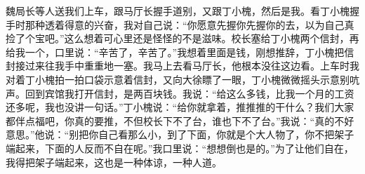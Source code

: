 \documentclass[12pt,oneside]{book}
\begin{document}
魏局长等人送我们上车，跟马厅长握手道别，又跟丁小槐，然后是我。看丁小槐握手时那种透着得意的兴奋，我对自己说：``你愿意先握你先握你的去，以为自己真捡了个宝吧。''这么想着可心里还是怪怪的不是滋味。校长塞给丁小槐两个信封，再给我一个，口里说：``辛苦了，辛苦了。''我想着里面是钱，刚想推辞，丁小槐把信封接过来往我手中重重地一塞。我马上去看马厅长，他根本没往这边看。上车时我对着丁小槐拍一拍口袋示意着信封，又向大徐瞟了一眼，丁小槐微微摇头示意别吭声。回到宾馆我打开信封，是两百块钱。我说：``给这么多钱，比我一个月的工资还多呢，我也没讲一句话。''丁小槐说：``给你就拿着，推推推的干什么？我们大家都伴点福吧，你真的要推，不但校长下不了台，谁也下不了台。''我说：``真的不好意思。''他说：``别把你自己看那么小，到了下面，你就是个大人物了，你不把架子端起来，下面的人反而不自在呢。''我口里说：``想想倒也是的。''为了让他们自在，我得把架子端起来，这也是一种体谅，一种人道。
\end{document}
